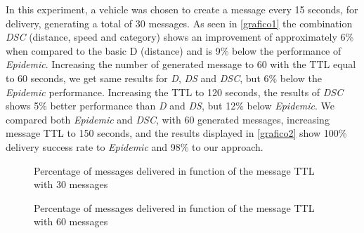 \documentclass[letterpaper, 10 pt, conference]{ieeeconf}  %
\begin{document}
In this experiment, a vehicle was chosen to create a message every 15 seconds, for delivery, generating a total of 30 messages. 
As seen in \autoref{grafico1} the combination \emph{DSC} (distance, speed and category) shows an improvement of approximately 6\% when compared to the basic D (distance) and is 9\% below the performance of \emph{Epidemic}. Increasing the number of generated message to 60 with the TTL equal to 60 seconds, we get same results for \emph{D}, \emph{DS} and \emph{DSC}, but 6\% below the \emph{Epidemic} performance. Increasing the TTL to 120 seconds, the results of \emph{DSC} shows 5\% better performance than \emph{D} and \emph{DS}, but 12\% below \emph{Epidemic}. We compared both \emph{Epidemic} and \emph{DSC}, with 60 generated messages, increasing message TTL to 150 seconds, and the results displayed in \autoref{grafico2} show 100\% delivery success rate to \emph{Epidemic} and 98\% to our approach.

\begin{figure}[thpb]
    \center
    \caption{Percentage of messages delivered in function of the message TTL with 30 messages} \label{grafico1}
\end{figure}

\begin{figure}[thpb]
    \center
    \caption{Percentage of messages delivered in function of the message TTL with 60 messages} \label{grafico2}
\end{figure}
\end{document}
